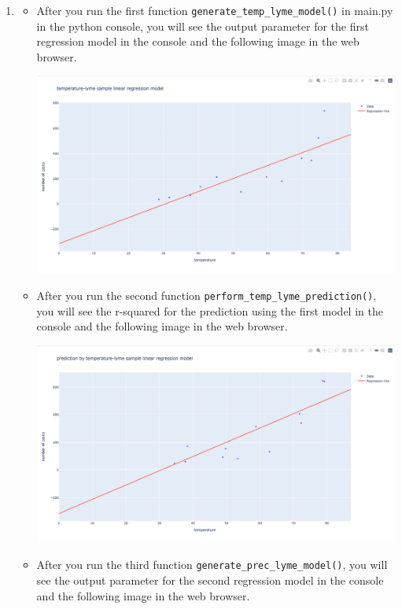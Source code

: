 \documentclass[fontsize=11pt]{article}
\begin{document}
\begin{enumerate}
 \newpage
  
  \item 
  \begin{itemize}
  \item   After you run the first function \texttt{generate\_temp\_lyme\_model()} in main.py in the python console, you will see the output parameter for the first regression model in the console and the following image in the web browser.
  
  \includegraphics[scale=0.3]{images/image 1.png}
  
  \item After you run the second function \texttt{perform\_temp\_lyme\_prediction()}, you will see the r-squared for the prediction using the first model in the console and the following image in the web browser.
  
  \includegraphics[scale=0.3]{images/image 2.png}
  
  \newpage
  \item After you run the third function \texttt{generate\_prec\_lyme\_model()}, you will see the output parameter for the second regression model in the console and the following image in the web browser.
  

\end{itemize}
\end{enumerate}
\end{document}
